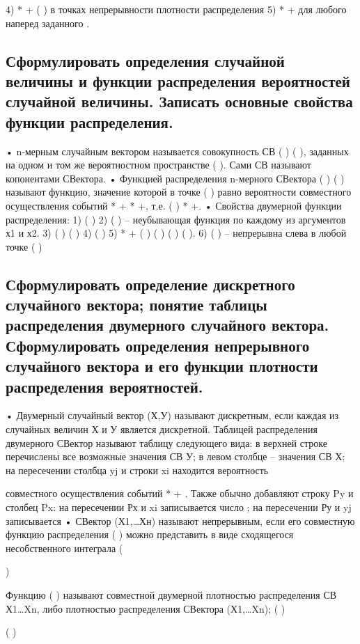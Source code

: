 4) * + ( ) в точках непрерывности плотности распределения
5) * + для любого наперед заданного . 

\subsection{Сформулировать определения случайной величины и функции распределения вероятностей случайной величины. Записать основные свойства функции распределения.}

• n-мерным случайным вектором называется совокупность СВ
( ) ( ), заданных на одном и том же вероятностном
пространстве ( ). Сами СВ называют копонентами СВектора.
• Функцией распределения n-мерного СВектора (
)
(
) называют функцию, значение которой в точке ( )
равно вероятности совместного осуществления событий *
+ *
+, т.е. (
) *
+.
• Свойства двумерной функции распределения:
1) (
)
2) (
) – неубывающая функция по каждому из аргументов х1 и х2.
3) (
) ( )
4) ( )
5) *
+ (
) (
) (
) (
).
6) (
) – непрерывна слева в любой точке ( )

\subsection{Сформулировать определение дискретного случайного вектора; понятие таблицы распределения двумерного случайного вектора. Сформулировать определения непрерывного случайного вектора и его функции плотности распределения вероятностей.}

• Двумерный случайный вектор (Х,У) называют дискретным, если каждая из случайных величин Х и У является дискретной.
Таблицей распределения двумерного СВектор называют таблицу следующего вида:
в верхней строке перечислены все возможные значения
СВ У; в левом столбце – значения
СВ Х;
на пересечении столбца yj и строки xi находится вероятность {
	
} совместного осуществления событий *
+ {
}.
Также обычно добавляют строку Py и столбец Px:
на пересечении Рх и xi записывается число ; на пересечении Ру и yj записывается
• СВектор (Х1,…Хн) называют непрерывным, если его совместную функцию распределения
(
) можно представить в виде
сходящегося несобственного интеграла (

)





Функцию (
) называют совместной двумерной плотностью распределения СВ Х1…Xn, либо плотностью распределения СВектора
(Х1,…Xn); (
)

( )




